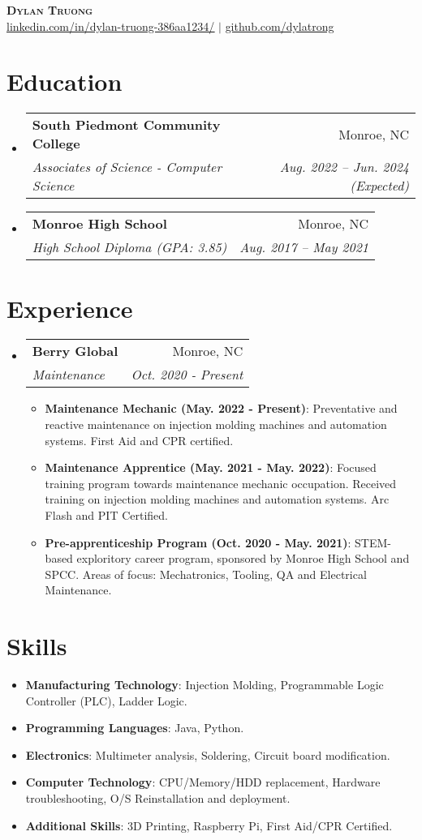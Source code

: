\documentclass[letterpaper,12pt]{article}
\makeatletter
\newcommand{\resumeItem}[2]{
  \item\small{
    \textbf{#1}{: #2 \vspace{-2pt}}
  }
}
\newcommand{\resumeSubheading}[4]{
  \vspace{-1pt}\item
    \begin{tabular*}{0.97\textwidth}[t]{l@{\extracolsep{\fill}}r}
      \textbf{#1} & #2 \\
      \textit{\small#3} & \textit{\small #4} \\
    \end{tabular*}\vspace{-5pt}
}
\newcommand{\resumeSubItem}[2]{\resumeItem{#1}{#2}\vspace{-4pt}}
\newcommand{\resumeSubHeadingListStart}{\begin{itemize}[leftmargin=*]}
\newcommand{\resumeSubHeadingListEnd}{\end{itemize}}
\newcommand{\resumeItemListStart}{\begin{itemize}}
\newcommand{\resumeItemListEnd}{\end{itemize}\vspace{-5pt}}
\makeatother
\begin{document}

\begin{center}
    \textbf{\Huge \scshape Dylan Truong} \\ \vspace{1pt}
    \href{https://www.linkedin.com/in/dylan-truong-386aa1234/}{\underline{linkedin.com/in/dylan-truong-386aa1234/}} $|$
    \href{https://github.com/dylatrong}{\underline{github.com/dylatrong}}
\end{center}

\section{Education}
  	\resumeSubHeadingListStart
	  \resumeSubheading
	  {South Piedmont Community College}{Monroe, NC}
	  {Associates of Science - Computer Science}{Aug. 2022 -- Jun. 2024 (Expected)}
    		\resumeSubheading
      		{Monroe High School}{Monroe, NC}
      		{High School Diploma (GPA: 3.85)}{Aug. 2017 -- May  2021}
  	\resumeSubHeadingListEnd

\section{Experience}
  	\resumeSubHeadingListStart
    	\resumeSubheading
      		{Berry Global}{Monroe, NC}
      		{Maintenance}{Oct. 2020 - Present}
      		\resumeItemListStart
				\resumeItem{Maintenance Mechanic (May. 2022 - Present)}
				{Preventative and reactive maintenance on injection molding machines and automation systems. First Aid and CPR certified.}
				\resumeItem{Maintenance Apprentice (May. 2021 - May. 2022)}
				{Focused training program towards maintenance mechanic occupation. Received training on injection molding machines and automation systems. Arc Flash and PIT Certified.}
				\resumeItem{Pre-apprenticeship Program (Oct. 2020 - May. 2021)}
				{STEM-based exploritory career program, sponsored by Monroe High School and SPCC. Areas of focus: Mechatronics, Tooling, QA and Electrical Maintenance.}
      		\resumeItemListEnd
  	\resumeSubHeadingListEnd

\section{Skills}
  	\resumeSubHeadingListStart
    	\resumeSubItem{Manufacturing Technology}{Injection Molding, Programmable Logic Controller (PLC), Ladder Logic.} 
   		\resumeSubItem{Programming Languages}{Java, Python.}
    	\resumeSubItem{Electronics}{Multimeter analysis, Soldering, Circuit board modification.} 
		\resumeSubItem{Computer Technology}{CPU/Memory/HDD replacement, Hardware troubleshooting, O/S Reinstallation and deployment.}
		\resumeSubItem{Additional Skills}{3D Printing, Raspberry Pi, First Aid/CPR Certified.}
  	\resumeSubHeadingListEnd
\end{document}
